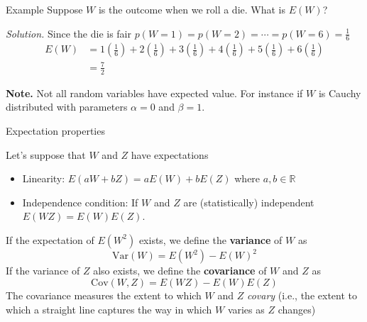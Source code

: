 \documentclass{beamer}
\begin{document}
\begin{frame}{Example}
	Suppose $W$ is the outcome when we roll a die. What is $E(W)$?
	
{\it Solution.} Since the die is fair $p(W=1)= p(W=2)= \cdots=p(W=6)=\frac 16$	
\begin{equation*}
\begin{split}
	E(W)&= 1 \left (\frac 16 \right) + 2 \left( \frac 16\right)+ 3 \left( \frac 16 \right) + 4 \left(\frac 16\right)+ 5 \left( \frac 16 \right) + 6 \left( \frac 16 \right)\\
	&= \frac 72
\end{split}
\end{equation*}

{\bf Note.} Not all random variables have expected value. For instance if $W$ is Cauchy distributed with parameters $\alpha =0$ and $\beta =1$. 
\end{frame}

\begin{frame}{Expectation properties}

Let's suppose that $W$ and $Z$ have expectations	
	\begin{itemize}
		\item Linearity: $E(aW+bZ)=a E(W)+b E(Z)$ where $a,b \in \mathbb{R}$
		\item Independence condition: If $W$ and $Z$ are (statistically) independent $E(WZ)= E(W)E(Z)$.
	\end{itemize}
If the expectation of $E(W^2)$ exists, we define the {\bf variance} of $W$ as
\begin{equation*}
\textrm{Var}(W)= E(W^2)-E(W)^2
\end{equation*}
If the variance of $Z$ also exists, we define the {\bf covariance} of $W$ and $Z$ as
\begin{equation*}
	\textrm{Cov}(W,Z)= E(WZ) - E(W)E(Z)
\end{equation*}
The covariance measures the extent to which $W$ and $Z$ \textit{covary} (i.e., the extent to which a straight line captures the way in which $W$ varies as $Z$ changes)
\end{frame}
\end{document}
